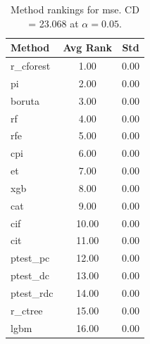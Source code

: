 \begin{table}[h]
\centering
\caption{Method rankings for mse. CD = 23.068 at $\alpha=0.05$.}
\label{tab:ranks_mse}
\begin{tabular}{lcc}
\toprule
Method & Avg Rank & Std \\
\midrule
r_cforest & 1.00 & 0.00 \\
pi & 2.00 & 0.00 \\
boruta & 3.00 & 0.00 \\
rf & 4.00 & 0.00 \\
rfe & 5.00 & 0.00 \\
cpi & 6.00 & 0.00 \\
et & 7.00 & 0.00 \\
xgb & 8.00 & 0.00 \\
cat & 9.00 & 0.00 \\
cif & 10.00 & 0.00 \\
cit & 11.00 & 0.00 \\
ptest_pc & 12.00 & 0.00 \\
ptest_dc & 13.00 & 0.00 \\
ptest_rdc & 14.00 & 0.00 \\
r_ctree & 15.00 & 0.00 \\
lgbm & 16.00 & 0.00 \\
\bottomrule
\end{tabular}
\end{table}